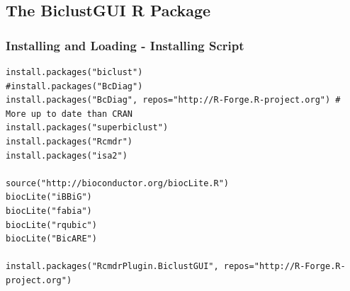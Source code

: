\documentclass[a4paper]{article}\usepackage[]{graphicx}\usepackage[]{color}
\begin{document}
\subsection{The BiclustGUI R Package}
\subsubsection{Installing and Loading - Installing Script}
\begin{verbatim}
install.packages("biclust")
#install.packages("BcDiag")
install.packages("BcDiag", repos="http://R-Forge.R-project.org") # More up to date than CRAN
install.packages("superbiclust")
install.packages("Rcmdr")
install.packages("isa2")

source("http://bioconductor.org/biocLite.R")
biocLite("iBBiG")
biocLite("fabia")
biocLite("rqubic")
biocLite("BicARE")

install.packages("RcmdrPlugin.BiclustGUI", repos="http://R-Forge.R-project.org")

\end{verbatim}
\end{document}
